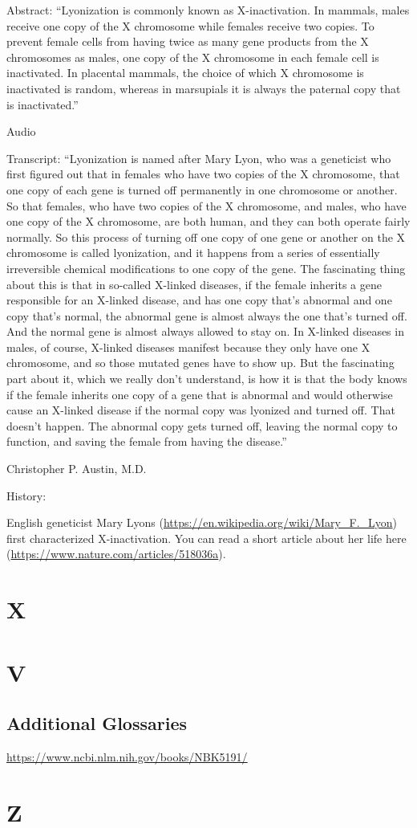 \documentclass[
]{book}
\begin{document}
Abstract: ``Lyonization is commonly known as X-inactivation. In mammals, males receive one copy of the X chromosome while females receive two copies. To prevent female cells from having twice as many gene products from the X chromosomes as males, one copy of the X chromosome in each female cell is inactivated. In placental mammals, the choice of which X chromosome is inactivated is random, whereas in marsupials it is always the paternal copy that is inactivated.''

Audio

Transcript: ``Lyonization is named after Mary Lyon, who was a geneticist who first figured out that in females who have two copies of the X chromosome, that one copy of each gene is turned off permanently in one chromosome or another. So that females, who have two copies of the X chromosome, and males, who have one copy of the X chromosome, are both human, and they can both operate fairly normally. So this process of turning off one copy of one gene or another on the X chromosome is called lyonization, and it happens from a series of essentially irreversible chemical modifications to one copy of the gene. The fascinating thing about this is that in so-called X-linked diseases, if the female inherits a gene responsible for an X-linked disease, and has one copy that's abnormal and one copy that's normal, the abnormal gene is almost always the one that's turned off. And the normal gene is almost always allowed to stay on. In X-linked diseases in males, of course, X-linked diseases manifest because they only have one X chromosome, and so those mutated genes have to show up. But the fascinating part about it, which we really don't understand, is how it is that the body knows if the female inherits one copy of a gene that is abnormal and would otherwise cause an X-linked disease if the normal copy was lyonized and turned off. That doesn't happen. The abnormal copy gets turned off, leaving the normal copy to function, and saving the female from having the disease.''

Christopher P. Austin, M.D.

History:

English geneticist Mary Lyons (\url{https://en.wikipedia.org/wiki/Mary_F._Lyon}) first characterized X-inactivation. You can read a short article about her life here (\url{https://www.nature.com/articles/518036a}).

\hypertarget{x}{%
\chapter{X}\label{x}}

\hypertarget{v-1}{%
\chapter{V}\label{v-1}}

\hypertarget{additional-glossaries}{%
\section{Additional Glossaries}\label{additional-glossaries}}

\url{https://www.ncbi.nlm.nih.gov/books/NBK5191/}

\hypertarget{z}{%
\chapter{Z}\label{z}}
\end{document}
